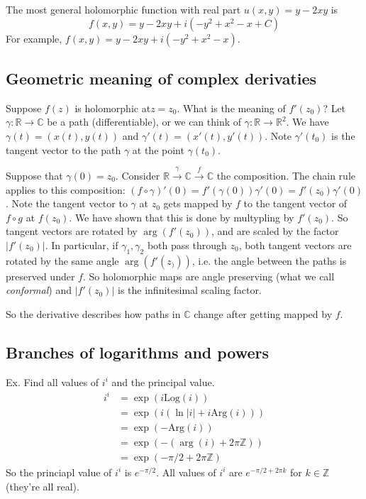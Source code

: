 \documentclass{article}
\theoremstyle{plain}
\theoremstyle{remark}
\newcommand{\Z}{{\mathbb Z}}
\newcommand{\R}{{\mathbb R}}
\newcommand{\C}{{\mathbb C}}
\begin{document}
The most general holomorphic function with real part $u(x,y) = y - 2xy$ is
\[
	f(x,y) = y - 2xy + i(-y^2 + x^2 - x + C)
\]
For example, $f(x,y) = y-2xy + i(-y^2 + x^2 - x)$.

\subsection{Geometric meaning of complex derivaties}
Suppose $f(z)$ is holomorphic at$z = z_0$.
What is the meaning of $f'(z_0)$?
Let $\gamma \colon \R \to \C$ be a path (differentiable),
or we can think of $\gamma \colon \R \to \R^2$.
We have $\gamma(t) = (x(t),y(t))$ and $\gamma'(t) = (x'(t),y'(t))$.
Note $\gamma'(t_0)$ is the tangent vector to the path
$\gamma$ at the point $\gamma(t_0)$.

Suppose that $\gamma(0) = z_0$.
Consider $\R \overset{\gamma}{\to}\C \overset{f}{\to} \C$ the composition.
The chain rule applies to this composition:
$(f\circ \gamma)'(0) = f'(\gamma(0))\gamma'(0) = f'(z_0) \gamma'(0)$.
Note the tangent vector to $\gamma$ at $z_0$ gets mapped by $f$
to the tangent vector of $f \circ g$ at $f(z_0)$.
We have shown that this is done by multypling by $f'(z_0)$.
So tangent vectors are rotated by $\arg(f'(z_0))$,
and are scaled by the factor $|f'(z_0)|$.
In particular, if $\gamma_1,\gamma_2$ both pass through $z_0$,
both tangent vectors are rotated by the same angle $\arg(f'(z_)))$,
i.e. the angle between the paths is preserved under $f$.
So holomorphic maps are angle preserving (what we call \emph{conformal})
and $|f'(z_0)|$ is the infinitesimal scaling factor.

So the derivative describes how paths in $\C$ change after getting mapped by $f$.

\subsection{Branches of logarithms and powers}
Ex. Find all values of $i^i$ and the principal value.
\begin{align*}
	i^i &= \exp(i \mathrm{Log}(i))\\
		&= \exp(i(\ln|i| + i\mathrm{Arg}(i)))\\
		&= \exp(-\mathrm{Arg}(i))\\
		&= \exp(-(\arg(i) + 2\pi\Z))\\
		&= \exp(-\pi/2 + 2\pi \Z)
\end{align*}
So the princiapl value of $i^i$ is $e^{-\pi/2}$.
All values of $i^i$ are $e^{-\pi/2 + 2\pi k}$ for $k \in \Z$ (they're all real).
\end{document}
